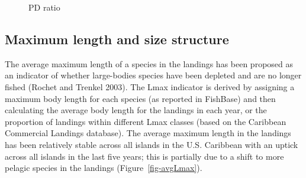 \documentclass[
  letterpaper,
  oneside,
  open=any]{scrbook}
\begin{document}
\begin{figure}


\caption{\label{fig-PD}PD ratio}

\end{figure}%

\subsection{Maximum length and size
structure}\label{maximum-length-and-size-structure}

The average maximum length of a species in the landings has been
proposed as an indicator of whether large-bodies species have been
depleted and are no longer fished (Rochet and Trenkel 2003). The Lmax
indicator is derived by assigning a maximum body length for each species
(as reported in FishBase) and then calculating the average body length
for the landings in each year, or the proportion of landings within
different Lmax classes (based on the Caribbean Commercial Landings
database). The average maximum length in the landings has been
relatively stable across all islands in the U.S. Caribbean with an
uptick across all islands in the last five years; this is partially due
to a shift to more pelagic species in the landings
(Figure~\ref{fig-avgLmax}).
\end{document}
